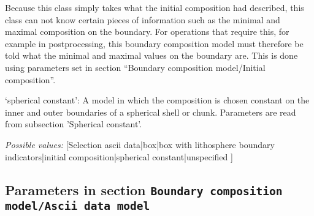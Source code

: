 \begin{itemize}
Because this class simply takes what the initial composition had described, this class can not know certain pieces of information such as the minimal and maximal composition on the boundary. For operations that require this, for example in postprocessing, this boundary composition model must therefore be told what the minimal and maximal values on the boundary are. This is done using parameters set in section ``Boundary composition model/Initial composition''.

`spherical constant': A model in which the composition is chosen constant on the inner and outer boundaries of a spherical shell or chunk. Parameters are read from subsection 'Spherical constant'.


{\it Possible values:} [Selection ascii data|box|box with lithosphere boundary indicators|initial composition|spherical constant|unspecified ]
\end{itemize}



\subsection{Parameters in section \tt Boundary composition model/Ascii data model}
\label{parameters:Boundary_20composition_20model/Ascii_20data_20model}

